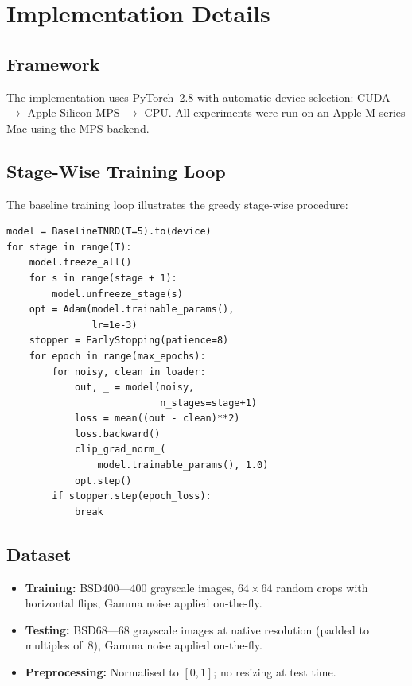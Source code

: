 \documentclass[10pt,conference]{IEEEtran}
\begin{document}
\section{Implementation Details}

\subsection{Framework}

The implementation uses PyTorch~2.8 with automatic device selection: CUDA
$\to$ Apple Silicon MPS $\to$ CPU.  All experiments were run on an Apple M-series
Mac using the MPS backend.

\subsection{Stage-Wise Training Loop}

The baseline training loop illustrates the greedy stage-wise procedure:

\begin{lstlisting}
model = BaselineTNRD(T=5).to(device)
for stage in range(T):
    model.freeze_all()
    for s in range(stage + 1):
        model.unfreeze_stage(s)
    opt = Adam(model.trainable_params(),
               lr=1e-3)
    stopper = EarlyStopping(patience=8)
    for epoch in range(max_epochs):
        for noisy, clean in loader:
            out, _ = model(noisy,
                           n_stages=stage+1)
            loss = mean((out - clean)**2)
            loss.backward()
            clip_grad_norm_(
                model.trainable_params(), 1.0)
            opt.step()
        if stopper.step(epoch_loss):
            break
\end{lstlisting}

\subsection{Dataset}

\begin{itemize}
    \item \textbf{Training:} BSD400---400 grayscale images, $64{\times}64$ random
          crops with horizontal flips, Gamma noise applied on-the-fly.
    \item \textbf{Testing:} BSD68---68 grayscale images at native resolution
          (padded to multiples of~8), Gamma noise applied on-the-fly.
    \item \textbf{Preprocessing:} Normalised to $[0,1]$; no resizing at test
          time.
\end{itemize}
\end{document}

